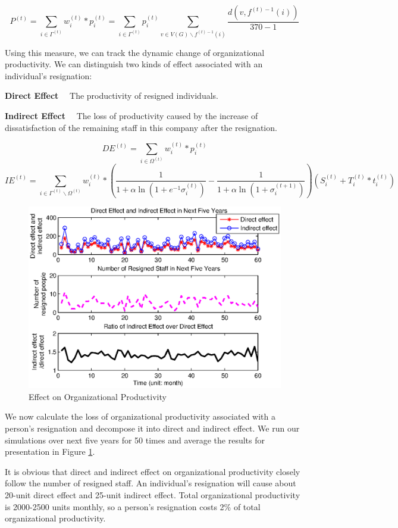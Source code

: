 \documentclass[tcn = 37075, sheet = false, abstract = false]{mcmthesis}
\begin{document}
	$$\displaystyle P^{(t)}=\sum\limits_{i\in\Gamma^{(t)}} w_i^{(t)}*p_i^{(t)}=\sum\limits_{i\in\Gamma^{(t)}}p_i^{(t)}\sum\limits_{v\in V(G)\backslash f^{(t)-1}(i)}\frac{d(v,f^{(t)-1}(i))}{370-1}$$
	
	Using this measure, we can track the dynamic change of organizational productivity. We can distinguish two kinds of effect associated with an individual's resignation:
	
	\noindent \textbf{Direct Effect} \ \ The productivity of resigned individuals.
	
	
	\noindent \textbf{Indirect Effect} \ \ The loss of productivity caused by the increase of dissatisfaction of the remaining staff in this company after the resignation.
	
	$$DE^{(t)}=\sum\limits_{i\in\Omega^{(t)}}w_i^{(t)}*p_i^{(t)}$$ $$IE^{(t)}=\sum\limits_{i\in\Gamma^{(t)}\backslash\Omega^{(t)}} w_i^{(t)}*(\frac{1}{1+\alpha\ln{(1+e^{-1}\sigma_i^{(t)})}}-\frac{1}{1+\alpha\ln{(1+\sigma_i^{(t+1)})}})(S_i^{(t)}+T_i^{(t)}*t_i^{(t)})$$
	
	\begin{figure}[htb!]
		\centering
		\includegraphics[width=14cm]{figures/Productivity_figure.eps}
		\caption{Effect on Organizational Productivity} 
		\label{fig:3}
	\end{figure}
	
	We now calculate the loss of organizational productivity associated with a person's resignation and decompose it into direct and indirect effect. We run our simulations over next five years for 50 times and average the results for presentation in Figure \ref{fig:3}.
	
	It is obvious that direct and indirect effect on organizational productivity closely follow the number of resigned staff. An individual's resignation will cause about 20-unit direct effect and 25-unit indirect effect. Total organizational productivity is 2000-2500 units monthly, so a person's resignation costs 2\% of total organizational productivity.
	
\end{document}

